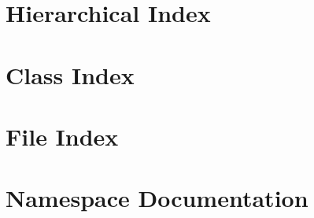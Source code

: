 \documentclass[twoside]{book}
\newcommand{\+}{\discretionary{\mbox{\scriptsize$\hookleftarrow$}}{}{}}
\begin{document}
\chapter{Hierarchical Index}

\chapter{Class Index}

\chapter{File Index}

\chapter{Namespace Documentation}






































\end{document}
